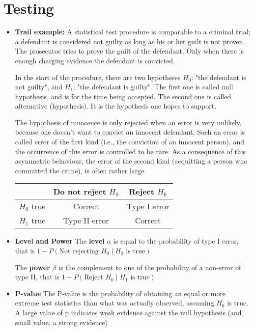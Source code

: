 \documentclass[twocolumn]{article}
\numberwithin{equation}{section}
\begin{document}
\section{Testing}
\begin{itemize}
	\item \textbf{Trail example: }
A statistical test procedure is comparable to a criminal trial; a defendant is considered not guilty as long as his or her guilt is not proven. The prosecutor tries to prove the guilt of the defendant. Only when there is enough charging evidence the defendant is convicted.

In the start of the procedure, there are two hypotheses $H_0$: "the defendant is not guilty", and $H_1$: "the defendant is guilty". The first one is called null hypothesis, and is for the time being accepted. The second one is called alternative (hypothesis). It is the hypothesis one hopes to support.

The hypothesis of innocence is only rejected when an error is very unlikely, because one doesn't want to convict an innocent defendant. Such an error is called error of the first kind (i.e., the conviction of an innocent person), and the occurrence of this error is controlled to be rare. As a consequence of this asymmetric behaviour, the error of the second kind (acquitting a person who committed the crime), is often rather large.

\begin{center}
\begin{tabular}{ccc}
& Do not reject $H_0$ & Reject $H_0$ \\
\hline
$H_0$ true & Correct & Type I error \\
$H_1$ true & Type II error & Correct\\
\hline
\end{tabular} 
\end{center}

	\item \textbf{Level and Power}
The \textbf{level} $\alpha$ is equal to the probability of type I error, that is $1-P(\text{Not rejecting }H_0 \mid H_0 \text{ is true})$

The \textbf{power} $\beta$ is the complement to one of the probability of a non-error of type II, that is  $1-P(\text{Reject }H_0 \mid H_1 \text{ is true})$

	\item \textbf{P-value}
The P-value is the probability of obtaining an equal or more extreme test statistics than what was actually observed, assuming $H_0$ is true.
A large value of p indicates weak evidence against the null hypothesis (and small value, a strong evidence)
\end{itemize}
\end{document}

